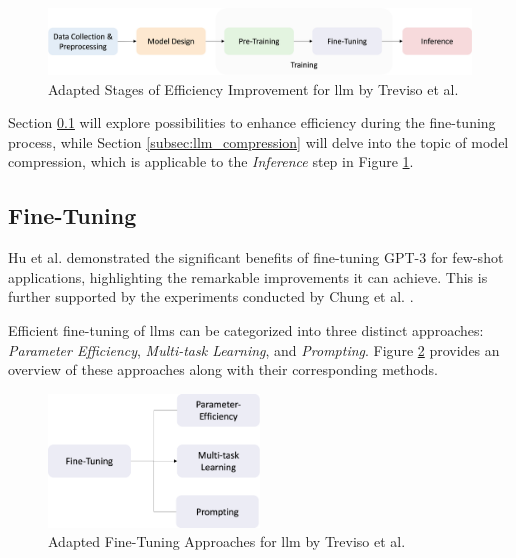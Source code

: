 \begin{figure}
    \centering
    \includegraphics[width=\textwidth]{Grafiken/Efficient_Survey_Steps.png}
    \caption{Adapted Stages of Efficiency Improvement for \gls{llm} by Treviso et al. \cite{treviso_efficient_2023}}
    \label{fig:llm_taxonomy}
\end{figure}

Section \ref{subsec:llm_fine_tuning} will explore possibilities to enhance efficiency during the fine-tuning process, while Section \ref{subsec:llm_compression} will delve into the topic of model compression, which is applicable to the \textit{Inference} step in Figure \ref{fig:llm_taxonomy}.



\subsection{Fine-Tuning}
\label{subsec:llm_fine_tuning}

Hu et al. \cite{hu_lora_nodate} demonstrated the significant benefits of fine-tuning GPT-3 for few-shot applications, highlighting the remarkable improvements it can achieve. This is further supported by the experiments conducted by Chung et al. \cite{chung_scaling_2022}.

Efficient fine-tuning of \gls{llm}s can be categorized into three distinct approaches: \textit{Parameter Efficiency}, \textit{Multi-task Learning}, and \textit{Prompting}. Figure \ref{fig:llm_fine_tuning} provides an overview of these approaches along with their corresponding methods.

\begin{figure}
    \centering
    \includegraphics[width=0.5\textwidth]{Grafiken/fine_tuning_approaches.png}
    \caption{Adapted Fine-Tuning Approaches for \gls{llm} by Treviso et al. \cite{treviso_efficient_2023}}
    \label{fig:llm_fine_tuning}
\end{figure}

